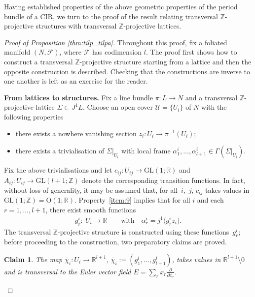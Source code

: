 \documentclass[10pt,a4paper]{amsart}
\numberwithin{equation}{section}
\newtheorem{Claim}[Theorem]{Claim}
\newcommand{\RR}{\mathbb{R}}
\newcommand{\ZZ}{\mathbb{Z}}
\begin{document}
Having established properties of the above geometric properties of the period bundle of a CIR, we turn to the proof of the result relating transversal $\ZZ$-projective structures with transversal $\ZZ$-projective lattices.

\begin{proof}[Proof of Proposition \ref{thm:tilp_tilpa}] Throughout this proof, f\/ix a foliated manifold $(N,\mathcal{F})$, where $\mathcal{F}$ has codimension $l$. The proof f\/irst shows how to construct a transversal $\ZZ$-projective structure starting from a lattice and then the opposite construction is described. Checking that the constructions are inverse to one another is left as an exercise for the reader.

{\bf From lattices to structures.} Fix a line bundle $\pi\colon L \to N$ and a transversal $\ZZ$-projective lattice $\Sigma \subset J^1L$. Choose an open cover $\mathcal{U} = \{U_i\}$ of $N$ with the following properties
 \begin{itemize}\itemsep=0pt
 \item there exists a nowhere vanishing section $z_i \colon U_i \to \pi^{-1}(U_i)$;
 \item there exists a trivialisation of $\Sigma|_{U_i}$ with local frame $\alpha^i_1,\ldots, \alpha^i_{l+1}\in \Gamma(\Sigma|_{U_i})$.
 \end{itemize}
Fix the above trivialisations and let $c_{ij}\colon U_{ij} \to \mathrm{GL}(1;\RR)$ and $A_{ij}\colon U_{ij} \to \mathrm{GL}(l+1;\ZZ)$ denote the corresponding transition functions. In fact, without loss of generality, it may be assumed that, for all~$i$,~$j$, $c_{ij}$ takes values in $\mathrm{GL}(1;\ZZ) = \mathrm{O}(1;\RR)$. Property~\ref{item:9} implies that for all $i$ and each $r = 1,\ldots, l+1$, there exist smooth functions
 \begin{gather*}
 g^i_r\colon \ U_i\to \RR\qquad \text{with}\quad \alpha^i_r = j^1\big(g_r^iz_i\big).
 \end{gather*}
The transversal $\ZZ$-projective structure is constructed using these functions~$g^i_r$; before proceeding to the construction, two preparatory claims are proved.

\begin{Claim}\label{claim:trans}
The map $\bar\chi_i\colon U_i\to \RR^{l+1}$, $\bar\chi_i:=(g^i_1,\ldots,g^i_{l+1})$, takes values in $\RR^{l+1}\setminus 0$ and is transversal to the Euler vector field $E=\sum\limits_rx_r\frac{\partial}{\partial x_r}$.
 \end{Claim}


\end{proof}
\end{document}
